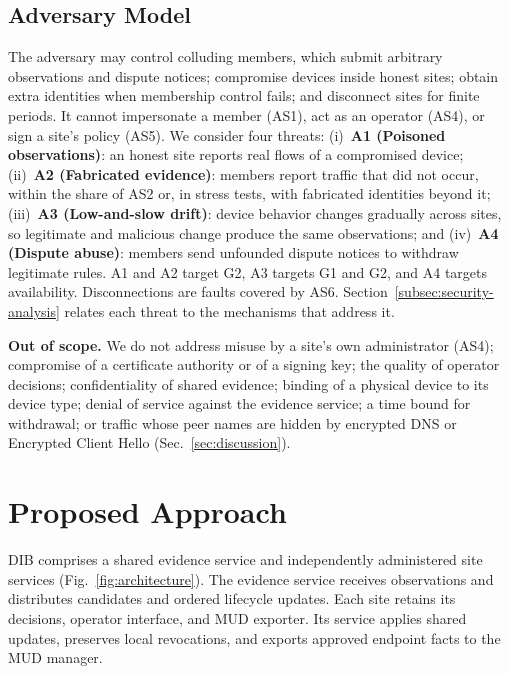 \documentclass[journal]{IEEEtran}
\theoremstyle{definition}
\begin{document}
\subsection{Adversary Model}
\label{subsec:adversary}
The adversary may control colluding members, which submit arbitrary observations and dispute notices; compromise devices inside honest sites; obtain extra identities when membership control fails; and disconnect sites for finite periods. It cannot impersonate a member (AS1), act as an operator (AS4), or sign a site's policy (AS5). We consider four threats:
(i)~\textbf{A1 (Poisoned observations)}: an honest site reports real flows of a compromised device; (ii)~\textbf{A2 (Fabricated evidence)}: members report traffic that did not occur, within the share of AS2 or, in stress tests, with fabricated identities beyond it; (iii)~\textbf{A3 (Low-and-slow drift)}: device behavior changes gradually across sites, so legitimate and malicious change produce the same observations; and (iv)~\textbf{A4 (Dispute abuse)}: members send unfounded dispute notices to withdraw legitimate rules. A1 and A2 target G2, A3 targets G1 and G2, and A4 targets availability. Disconnections are faults covered by AS6. Section~\ref{subsec:security-analysis} relates each threat to the mechanisms that address it.

\textbf{Out of scope.} We do not address misuse by a site's own administrator (AS4); compromise of a certificate authority or of a signing key; the quality of operator decisions; confidentiality of shared evidence; binding of a physical device to its device type; denial of service against the evidence service; a time bound for withdrawal; or traffic whose peer names are hidden by encrypted DNS or Encrypted Client Hello (Sec.~\ref{sec:discussion}).


\section{Proposed Approach}
\label{sec:design}
DIB comprises a shared evidence service and independently administered site services (Fig.~\ref{fig:architecture}). The evidence service receives observations and distributes candidates and ordered lifecycle updates. Each site retains its decisions, operator interface, and MUD exporter. Its service applies shared updates, preserves local revocations, and exports approved endpoint facts to the MUD manager.
\end{document}

